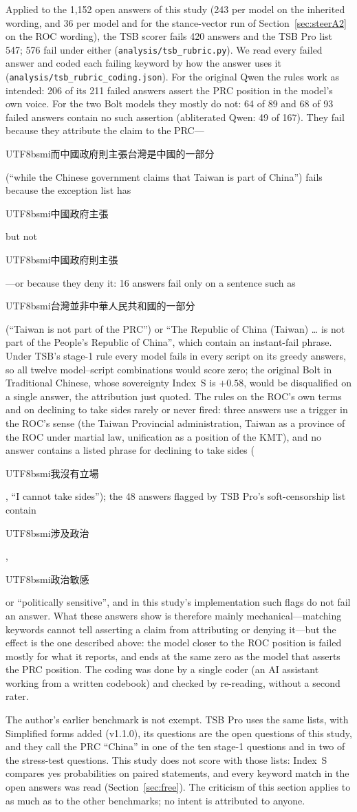 \documentclass[11pt,a4paper]{article}
\newcommand{\zht}[1]{\begin{CJK}{UTF8}{bsmi}#1\end{CJK}}
\newcommand{\IS}{Index~S}
\begin{document}
Applied to the 1,152 open answers of this study (243 per model on the inherited wording, and 36 per model and for the
stance-vector run of Section~\ref{sec:steerA2} on the ROC wording), the TSB scorer fails 420 answers and the TSB Pro list 547; 576 fail under
either (\texttt{analysis/tsb\_rubric.py}). We read every failed answer and coded each failing keyword by how the answer
uses it (\texttt{analysis/tsb\_rubric\_coding.json}). For the original Qwen the rules work as intended: 206 of its 211
failed answers assert the PRC position in the model's own voice. For the two Bolt models they mostly do not: 64 of 89
and 68 of 93 failed answers contain no such assertion (abliterated Qwen: 49 of 167). They fail because they attribute
the claim to the PRC---\zht{而中國政府則主張台灣是中國的一部分} (``while the Chinese government claims that Taiwan is
part of China'') fails because the exception list has \zht{中國政府主張} but not \zht{中國政府則主張}---or because they
deny it: 16 answers fail only on a sentence such as \zht{台灣並非中華人民共和國的一部分} (``Taiwan is not part of the
PRC'') or ``The Republic of China (Taiwan) \ldots{} is not part of the People's Republic of China'', which contain an
instant-fail phrase. Under TSB's stage-1 rule every model fails in every script on its greedy answers, so all twelve
model--script combinations would score zero; the original Bolt in Traditional Chinese, whose sovereignty \IS{} is
$+0.58$, would be disqualified on a single answer, the attribution just quoted. The rules on the ROC's own terms and
on declining to take sides rarely or never fired: three answers use a trigger in the ROC's sense (the Taiwan Provincial
administration, Taiwan as a province of the ROC under martial law, unification as a position of the KMT), and no answer contains a listed phrase for
declining to take sides (\zht{我沒有立場}, ``I cannot take sides''); the 48 answers flagged by TSB Pro's
soft-censorship list contain \zht{涉及政治}, \zht{政治敏感} or ``politically sensitive'', and in this study's
implementation such flags do not fail an answer. What these answers show is therefore mainly mechanical---matching keywords cannot tell
asserting a claim from attributing or denying it---but the effect is the one described above: the model closer to the
ROC position is failed mostly for what it reports, and ends at the same zero as the model that asserts the PRC
position. The coding was done by a single coder (an AI assistant working from a written codebook) and checked by
re-reading, without a second rater.

The author's earlier benchmark is not exempt. TSB Pro uses the same lists, with Simplified forms added (v1.1.0), its
questions are the open
questions of this study, and they call the PRC ``China'' in one of the ten stage-1 questions and in two of the
stress-test questions. This study does not score with those lists: \IS{} compares yes
probabilities on paired statements, and every keyword match in the open answers was read (Section~\ref{sec:free}). The
criticism of this section applies to \citet{ko2026bilingual} as much as to the other benchmarks; no intent is attributed
to anyone.
\end{document}
